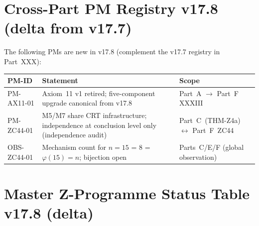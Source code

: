 \documentclass[12pt, a4paper]{article}
\begin{document}
\section{Cross-Part PM Registry v17.8 (delta from v17.7)}
\label{sec:pm-registry}

\begin{keybox}[title={New Phase Misalignments in v17.8}]
The following PMs are new in v17.8 (complement the v17.7
registry in Part~XXX):

\medskip
{\small
\renewcommand{\arraystretch}{1.35}
\begin{center}
\begin{tabular}{p{2.5cm}p{4.5cm}p{5.0cm}}
\toprule
\textbf{PM-ID} & \textbf{Statement} & \textbf{Scope} \\
\midrule
PM-AX11-01 & Axiom~11 v1 retired; five-component upgrade
  canonical from v17.8 & Part~A $\to$ Part~F XXXIII \\
PM-ZC44-01 & M5/M7 share CRT infrastructure; independence
  at conclusion level only (independence audit) &
  Part~C~(THM-Z4a) $\leftrightarrow$ Part~F~ZC44 \\
OBS-ZC44-01 & Mechanism count for $n=15$ = 8 =
  $\varphi(15) = n$; bijection open &
  Parts~C/E/F (global observation) \\
\bottomrule
\end{tabular}
\end{center}
}
\end{keybox}

\newpage

\section{Master Z-Programme Status Table v17.8 (delta)}
\label{sec:status-delta}
\end{document}
